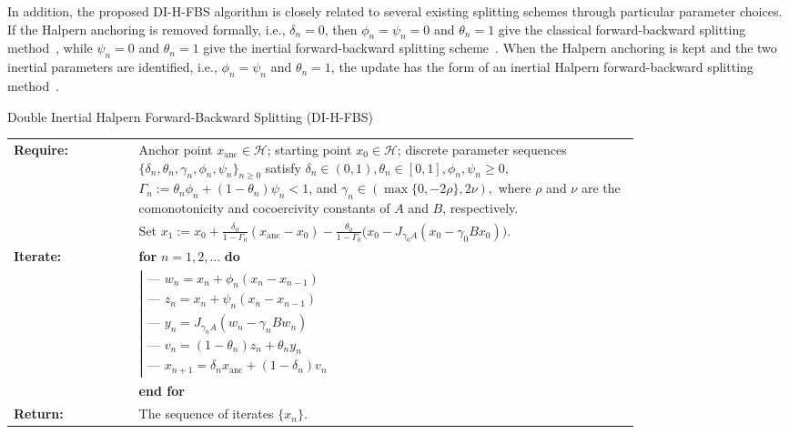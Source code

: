 \documentclass{article}
\theoremstyle{definition}
\theoremstyle{definition}
\theoremstyle{definition}
\begin{document}
In addition, the proposed DI-H-FBS algorithm is closely related to several existing splitting schemes through particular parameter choices. If the Halpern anchoring is removed formally, i.e., $\delta_n=0$, then $\phi_n=\psi_n=0$ and $\theta_n=1$ give the classical forward-backward splitting method~\cite{Combettes}, while $\psi_n=0$ and $\theta_n=1$ give the inertial forward-backward splitting scheme~\cite{lorenz2015inertial}. When the Halpern anchoring is kept and the two inertial parameters are identified, i.e., $\phi_n=\psi_n$ and $\theta_n=1$, the update has the form of an inertial Halpern forward-backward splitting method~\cite{cholamjiak2018inertial}.


\begin{algorithm}[H]
\caption{Double Inertial Halpern Forward-Backward Splitting (DI-H-FBS)}
\label{alg:DIH_FBS}
\begin{minipage}{\textwidth}
\begin{tabular}{lp{0.8\linewidth}}
\textbf{Require:} & Anchor point $x_{\mathrm{anc}} \in \mathcal{H}$; starting point $x_0 \in \mathcal{H}$; discrete parameter sequences $\{ \delta_n, \theta_n, \gamma_n, \phi_n, \psi_n \}_{n \ge 0}$ satisfy $\delta_n \in (0, 1), \theta_n \in [0, 1], \phi_n, \psi_n \ge 0$, $\Gamma_n:=\theta_n\phi_n+(1-\theta_n)\psi_n<1$, and $\gamma_n \in (\max\{0, -2\rho\}, 2\nu),$
where $\rho$ and $\nu$ are the comonotonicity and cocoercivity constants of $A$ and $B$, respectively.\\
& Set $x_1 := x_0 + \frac{\delta_0}{1 - \Gamma_0}(x_{\mathrm{anc}} - x_0) - \frac{\theta_0}{1 - \Gamma_0}\bigl(x_0 - J_{\gamma_0 A}(x_0 - \gamma_0 B x_0)\bigr)$.\\
\textbf{Iterate:} & \textbf{for} $n = 1, 2, \dots$ \textbf{do} \\
& \quad $\left| \begin{array}{l}
  \text{--- } w_n = x_n + \phi_n ( x_n - x_{n-1} ) \\
  \text{--- } z_n = x_n + \psi_n ( x_n - x_{n-1} ) \\
  \text{--- } y_n = J_{\gamma_n A} ( w_n - \gamma_n B w_n ) \\
  \text{--- } v_n = ( 1 - \theta_n ) z_n + \theta_n y_n \\
  \text{--- } x_{n+1} = \delta_n x_{\mathrm{anc}} + ( 1 - \delta_n ) v_n
\end{array} \right.$ \\
& \textbf{end for} \\
\textbf{Return:} & The sequence of iterates $\{x_n\}$. \\
\end{tabular}
\end{minipage}
\end{algorithm}
\end{document}
